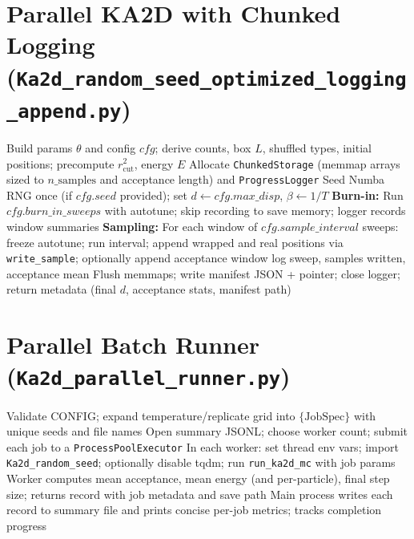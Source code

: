 \documentclass[11pt]{article}
\begin{document}
\section*{Parallel KA2D with Chunked Logging (\texttt{Ka2d\_random\_seed\_optimized\_logging\_append.py})}
\begin{algorithm}[t]
\caption{Single run with progress logging and chunked sample writes}
\label{alg:ka2d-chunked}
\begin{algorithmic}[1]
  \State Build params \(\theta\) and config \(cfg\); derive counts, box \(L\), shuffled types, initial positions; precompute \(r_\mathrm{cut}^2\), energy \(E\)
  \State Allocate \texttt{ChunkedStorage} (memmap arrays sized to \(n\_\text{samples}\) and acceptance length) and \texttt{ProgressLogger}
  \State Seed Numba RNG once (if \(cfg.seed\) provided); set \(d \gets cfg.max\_disp\), \(\beta \gets 1/T\)
  \State \textbf{Burn-in:} Run \(cfg.burn\_in\_sweeps\) with autotune; skip recording to save memory; logger records window summaries
  \State \textbf{Sampling:} For each window of \(cfg.sample\_interval\) sweeps:
    \State \quad freeze autotune; run interval; append wrapped and real positions via \texttt{write\_sample}; optionally append acceptance window
    \State \quad log sweep, samples written, acceptance mean
  \State Flush memmaps; write manifest JSON + pointer; close logger; return metadata (final \(d\), acceptance stats, manifest path)
\end{algorithmic}
\end{algorithm}

\section*{Parallel Batch Runner (\texttt{Ka2d\_parallel\_runner.py})}
\begin{algorithm}[t]
\caption{Process pool driver over a temperature/replicate grid}
\label{alg:parallel-runner}
\begin{algorithmic}[1]
  \State Validate CONFIG; expand temperature/replicate grid into \(\{\text{JobSpec}\}\) with unique seeds and file names
  \State Open summary JSONL; choose worker count; submit each job to a \texttt{ProcessPoolExecutor}
  \State In each worker: set thread env vars; import \texttt{Ka2d\_random\_seed}; optionally disable tqdm; run \texttt{run\_ka2d\_mc} with job params
  \State Worker computes mean acceptance, mean energy (and per-particle), final step size; returns record with job metadata and save path
  \State Main process writes each record to summary file and prints concise per-job metrics; tracks completion progress
\end{algorithmic}
\end{algorithm}
\end{document}
